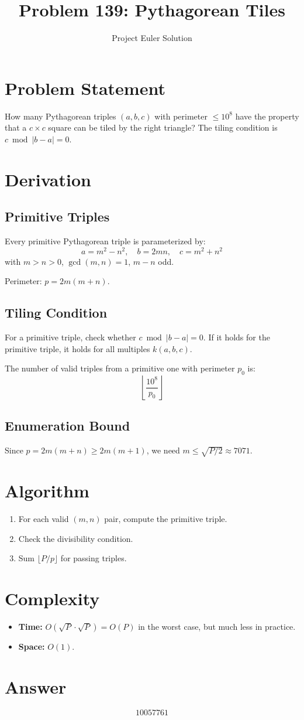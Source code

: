 \documentclass[12pt]{article}
\title{Problem 139: Pythagorean Tiles}
\author{Project Euler Solution}
\date{}
\begin{document}
\maketitle

\section{Problem Statement}
How many Pythagorean triples $(a, b, c)$ with perimeter $\leq 10^8$ have the property that a $c \times c$ square can be tiled by the right triangle? The tiling condition is $c \bmod |b - a| = 0$.

\section{Derivation}

\subsection{Primitive Triples}
Every primitive Pythagorean triple is parameterized by:
\[
a = m^2 - n^2, \quad b = 2mn, \quad c = m^2 + n^2
\]
with $m > n > 0$, $\gcd(m, n) = 1$, $m - n$ odd.

Perimeter: $p = 2m(m + n)$.

\subsection{Tiling Condition}
For a primitive triple, check whether $c \bmod |b - a| = 0$. If it holds for the primitive triple, it holds for all multiples $k(a, b, c)$.

The number of valid triples from a primitive one with perimeter $p_0$ is:
\[
\left\lfloor \frac{10^8}{p_0} \right\rfloor
\]

\subsection{Enumeration Bound}
Since $p = 2m(m+n) \geq 2m(m+1)$, we need $m \leq \sqrt{P/2} \approx 7071$.

\section{Algorithm}
\begin{enumerate}
\item For each valid $(m, n)$ pair, compute the primitive triple.
\item Check the divisibility condition.
\item Sum $\lfloor P / p \rfloor$ for passing triples.
\end{enumerate}

\section{Complexity}
\begin{itemize}
\item \textbf{Time:} $O(\sqrt{P} \cdot \sqrt{P}) = O(P)$ in the worst case, but much less in practice.
\item \textbf{Space:} $O(1)$.
\end{itemize}

\section{Answer}

\[
\boxed{10057761}
\]
\end{document}
